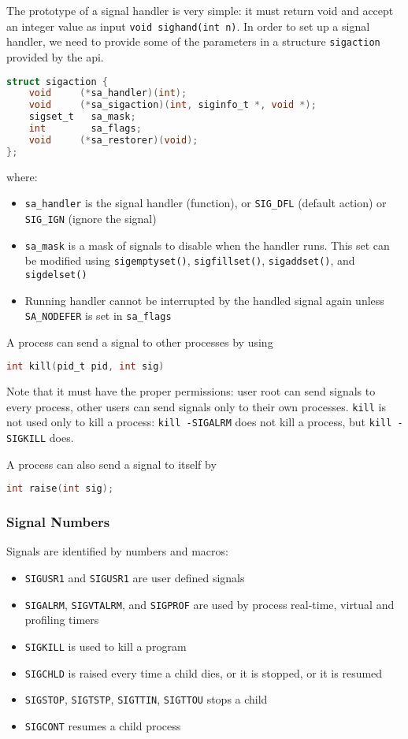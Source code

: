 The prototype of a signal handler is very simple: it must return void and accept an integer value as input \texttt{void sighand(int n)}.
In order to set up a signal handler, we need to provide some of the parameters in a structure \texttt{sigaction} provided by the api.

\begin{lstlisting}[language=C]
struct sigaction {
    void     (*sa_handler)(int);
    void     (*sa_sigaction)(int, siginfo_t *, void *);
    sigset_t   sa_mask;
    int        sa_flags;
    void     (*sa_restorer)(void);
};
\end{lstlisting}
where:
\begin{itemize}
    \item \texttt{sa\_handler} is the signal handler (function), or \texttt{SIG\_DFL} (default action) or \texttt{SIG\_IGN} (ignore the signal)
    \item \texttt{sa\_mask} is a mask of signals to disable when the handler runs. This set can be modified using \texttt{sigemptyset()}, \texttt{sigfillset()}, \texttt{sigaddset()}, and \texttt{sigdelset()}
    \item Running handler cannot be interrupted by the handled signal again unless \texttt{SA\_NODEFER} is set in \texttt{sa\_flags}
\end{itemize}

A process can send a signal to other processes by using 
\begin{lstlisting}[language=C]
    int kill(pid_t pid, int sig)
\end{lstlisting}
Note that it must have the proper permissions: user root can send signals to every process, other users can send signals only to their own processes.
\texttt{kill} is not used only to kill a process: \texttt{kill -SIGALRM} does not kill a process, but \texttt{kill -SIGKILL} does.

A process can also send a signal to itself by 
\begin{lstlisting}[language=C]
    int raise(int sig);
\end{lstlisting}

\subsubsection{Signal Numbers}
Signals are identified by numbers and macros:
\begin{itemize}
    \item \texttt{SIGUSR1} and \texttt{SIGUSR1} are user defined signals
    \item \texttt{SIGALRM}, \texttt{SIGVTALRM}, and \texttt{SIGPROF} are used by process real-time, virtual and profiling timers
    \item \texttt{SIGKILL} is used to kill a program
    \item \texttt{SIGCHLD} is raised every time a child dies, or it is stopped, or it is resumed
    \item \texttt{SIGSTOP}, \texttt{SIGTSTP}, \texttt{SIGTTIN}, \texttt{SIGTTOU} stops a child
    \item \texttt{SIGCONT} resumes a child process
\end{itemize}

